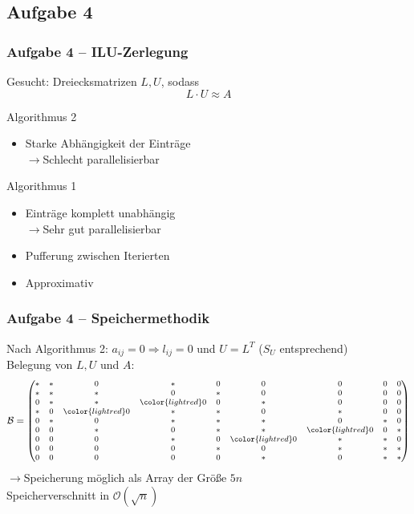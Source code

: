 \documentclass[german,notes,18pt]{beamer}
\begin{document}
	\subsection{Aufgabe 4}
	\begin{frame}
		\frametitle{Aufgabe 4 -- ILU-Zerlegung}
		
		Gesucht: Dreiecksmatrizen $L,U$, sodass
		\begin{equation*}
			L\cdot U\approx A
		\end{equation*}
		
		Algorithmus 2
		\begin{itemize}
			\item Starke Abhängigkeit der Einträge \\
			$\rightarrow$Schlecht parallelisierbar
		\end{itemize}
		Algorithmus 1
		\begin{itemize}
			\item Einträge komplett unabhängig \\
			$\rightarrow$Sehr gut parallelisierbar
			\item Pufferung zwischen Iterierten
			\item Approximativ
		\end{itemize}
	\end{frame}
	\begin{frame}
		\frametitle{Aufgabe 4 -- Speichermethodik}
		Nach Algorithmus 2: $a_{ij}=0\Rightarrow l_{ij}=0$ und $U=L^T$ ($S_U$ entsprechend) \\
		Belegung von $L,U$ und $A$:
		\begin{equation*}
			\footnotesize
			\mathcal{B}=\begin{pmatrix}
			* & * & 0 & * & 0 & 0 & 0 & 0 & 0 \\
			* & * & * & 0 & * & 0 & 0 & 0 & 0 \\
			0 & * & * & \color{lightred}0 & 0 & * & 0 & 0 & 0 \\
			* & 0 & \color{lightred}0 & * & * & 0 & * & 0 & 0 \\
			0 & * & 0 & * & * & * & 0 & * & 0 \\
			0 & 0 & * & 0 & * & * & \color{lightred}0 & 0 & * \\
			0 & 0 & 0 & * & 0 & \color{lightred}0 & * & * & 0 \\
			0 & 0 & 0 & 0 & * & 0 & * & * & * \\
			0 & 0 & 0 & 0 & 0 & * & 0 & * & *
			\end{pmatrix}
		\end{equation*}
		$\rightarrow$Speicherung möglich als Array der Größe $5n$ \\
		{\color{lightred}Speicherverschnitt} in $\mathcal{O}(\sqrt{n})$
	\end{frame}
\end{document}
